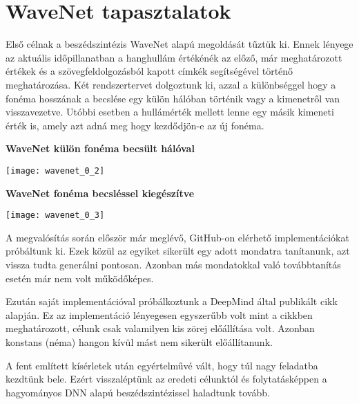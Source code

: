 \section{WaveNet tapasztalatok}

Első célnak a beszédszintézis WaveNet alapú megoldását tűztük ki. Ennek lényege az aktuális időpillanatban a hanghullám értékénék az előző, már meghatározott értékek és a szövegfeldolgozásból kapott címkék segítségével történő meghatározása. Két rendszertervet dolgoztunk ki, azzal a különbséggel hogy a fonéma hosszának a becslése egy külön hálóban történik vagy a kimenetről van visszavezetve. Utóbbi esetben a hullámérték mellett lenne egy másik kimeneti érték is, amely azt adná meg hogy kezdődjön-e az új fonéma.

\begin{centering}
	\textbf{WaveNet külön fonéma becsült hálóval}\par\medskip\centering
	\texttt{[image: wavenet\_0\_2]}
	
	\textbf{WaveNet fonéma becsléssel kiegészítve}\par\medskip
	\texttt{[image: wavenet\_0\_3]}
\end{centering}

A megvalósítás során először már meglévő, GitHub-on elérhető implementációkat próbáltunk ki. Ezek közül az egyiket sikerült egy adott mondatra tanítanunk, azt vissza tudta generálni pontosan. Azonban más mondatokkal való továbbtanítás esetén már nem volt működőképes.

Ezután saját implementációval próbálkoztunk a DeepMind által publikált cikk alapján. Ez az implementáció lényegesen egyszerűbb volt mint a cikkben meghatározott, célunk csak valamilyen kis zörej előállítása volt. Azonban konstans (néma) hangon kívül mást nem sikerült előállítanunk.

A fent említett kísérletek után egyértelművé vált, hogy túl nagy feladatba kezdtünk bele. Ezért visszaléptünk az eredeti célunktól és folytatásképpen a hagyományos DNN alapú beszédszintézissel haladtunk tovább.